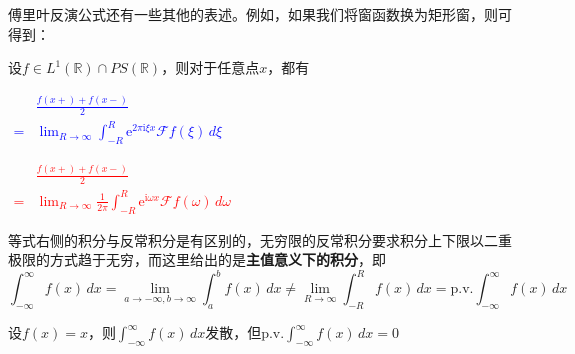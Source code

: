 \documentclass{ctexbook}
\newcommand{\lr}[2]{%
    \begin{center}
    \begin{minipage}[t]{0.45\textwidth}
        \centering
        \allowdisplaybreaks
        \textcolor{blue}{%
            \begin{varwidth}{\linewidth}
            $\begin{aligned}
            #1
            \end{aligned}$
            \end{varwidth}
        }
    \end{minipage}
    \hfill
    \begin{minipage}[t]{0.45\textwidth}
        \centering
        \allowdisplaybreaks
        \textcolor{red}{%
            \begin{varwidth}{\linewidth}
            $\begin{aligned}
            #2
            \end{aligned}$
            \end{varwidth}
        }
    \end{minipage}
\end{center}
}
\begin{document}
傅里叶反演公式还有一些其他的表述。例如，如果我们将窗函数换为矩形窗，则可得到：
\begin{theorem}[傅里叶反演公式]
    设$f\in L^1(\mathbb{R})\cap PS(\mathbb{R})$，则对于任意点$x$，都有
    \lr{
        &\frac{f(x+)+f(x-)}{2}\\
        =&\lim_{R\to \infty}\int_{-R}^{R}\mathrm{e}^{2\pi \mathrm{i}\xi x}\mathcal{F} f(\xi)\,d\xi
    }{
        &\frac{f(x+)+f(x-)}{2}\\
        =&\lim_{R\to \infty}\frac{1}{2\pi}\int_{-R}^{R}\mathrm{e}^{\mathrm{i}\omega x}\mathcal{F} f(\omega)\,d\omega
    }
\end{theorem}
等式右侧的积分与反常积分是有区别的，无穷限的反常积分要求积分上下限以二重极限的方式趋于无穷，而这里给出的是\textbf{主值意义下的积分}，即
\[\int_{-\infty}^{\infty}f(x)\,dx=\lim_{a\to-\infty,b\to\infty}\int_{a}^{b}f(x)\,dx\neq \lim_{R\to\infty}\int_{-R}^{R}f(x)\,dx=\text{p.v.}\int_{-\infty}^{\infty}f(x)\,dx\]
\begin{example}
    设$f(x)=x$，则$\int_{-\infty}^{\infty}f(x)\,dx$发散，但$\text{p.v.}\int_{-\infty}^{\infty}f(x)\,dx=0$
\end{example}
\end{document}
